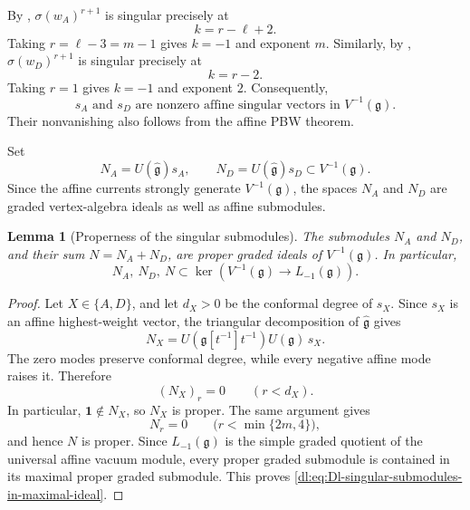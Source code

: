\documentclass[11pt,reqno]{amsart}
\newtheorem{lemma}[theorem]{Lemma}
\theoremstyle{definition}
\theoremstyle{remark}
\begin{document}
By \cite[Theorem~4.2(4)(a)]{ArakawaMoreau2018},
\(\sigma(w_A)^{r+1}\) is singular precisely at
\begin{equation*}
  k=r-\ell+2.
\end{equation*}
Taking \(r=\ell-3=m-1\) gives \(k=-1\) and exponent \(m\).
Similarly, by
\cite[Theorem~4.2(4)(b)]{ArakawaMoreau2018},
\(\sigma(w_D)^{r+1}\) is singular precisely at
\begin{equation*}
  k=r-2.
\end{equation*}
Taking \(r=1\) gives \(k=-1\) and exponent \(2\).  Consequently,
\begin{equation*}
  s_A\text{ and }s_D
  \text{ are nonzero affine singular vectors in }
  V^{-1}(\mathfrak g).
\end{equation*}
Their nonvanishing also follows from the affine PBW theorem.

Set
\begin{equation*}
  N_A=U(\widehat{\mathfrak g})s_A,
  \qquad
  N_D=U(\widehat{\mathfrak g})s_D
  \subset V^{-1}(\mathfrak g).
\end{equation*}
Since the affine currents strongly generate \(V^{-1}(\mathfrak g)\),
the spaces \(N_A\) and \(N_D\) are graded vertex-algebra ideals as well
as affine submodules.

\begin{lemma}[Properness of the singular submodules]
\label{dl:lem:Dl-singular-submodules-proper}
The submodules \(N_A\) and \(N_D\), and their sum
\(N=N_A+N_D\), are proper graded ideals of
\(V^{-1}(\mathfrak g)\).  In particular,
\begin{equation}
  N_A,\ N_D,\ N
  \subset
  \ker\!\left(
    V^{-1}(\mathfrak g)\longrightarrow L_{-1}(\mathfrak g)
  \right).
  \label{dl:eq:Dl-singular-submodules-in-maximal-ideal}
\end{equation}
\end{lemma}

\begin{proof}
Let \(X\in\{A,D\}\), and let \(d_X>0\) be the conformal degree of
\(s_X\).  Since \(s_X\) is an affine highest-weight vector, the
triangular decomposition of \(\widehat{\mathfrak g}\) gives
\begin{equation*}
  N_X
  =
  U\!\left(\mathfrak g[t^{-1}]t^{-1}\right)
  U(\mathfrak g)\,s_X.
\end{equation*}
The zero modes preserve conformal degree, while every negative affine
mode raises it.  Therefore
\begin{equation*}
  (N_X)_r=0
  \qquad
  (r<d_X).
\end{equation*}
In particular, \(\mathbf1\notin N_X\), so \(N_X\) is proper.  The same
argument gives
\[
  N_r=0
  \qquad
  \bigl(r<\min\{2m,4\}\bigr),
\]
and hence \(N\) is proper.  Since \(L_{-1}(\mathfrak g)\) is the simple
graded quotient of the universal affine vacuum module, every proper
graded submodule is contained in its maximal proper graded submodule.
This proves \eqref{dl:eq:Dl-singular-submodules-in-maximal-ideal}.
\end{proof}
\end{document}
